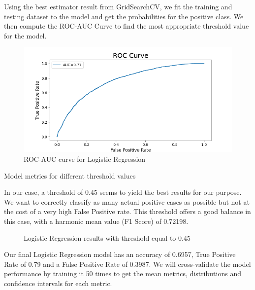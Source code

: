 \documentclass[12pt]{article}
\begin{document}
\noindent Using the best estimator result from GridSearchCV, we fit the training and testing dataset to the model and get the probabilities for the positive class. We then compute the ROC-AUC Curve to find the most appropriate threshold value for the model.
\begin{figure}[h]
    \centering
    \includegraphics[width=\textwidth]{images/roc_lr.png}
    \caption{ROC-AUC curve for Logistic Regression}
    \label{fig:my_label}
\end{figure}

\begin{table}[h]
    \centering
    \begin{adjustbox}{width=1\textwidth}
    
    \end{adjustbox}{}
    \caption{Model metrics for different threshold values}
    \label{tab:my_label}
\end{table}

\noindent In our case, a threshold of 0.45 seems to yield the best results for our purpose. We want to correctly classify as many actual positive cases as possible but not at the cost of a very high False Positive rate. This threshold offers a good balance in this case, with a harmonic mean value (F1 Score) of 0.72198. 


\begin{figure}[h]
    \centering
    \hspace{1cm}
    \caption{Logistic Regression results with threshold equal to 0.45}
    \label{fig:tables}
\end{figure}
\newpage
\noindent Our final Logistic Regression model has an accuracy of 0.6957, True Positive Rate of 0.79 and a False Positive Rate of 0.3987. We will cross-validate the model performance by training it 50 times to get the mean metrics, distributions and confidence intervals for each metric.
\end{document}
